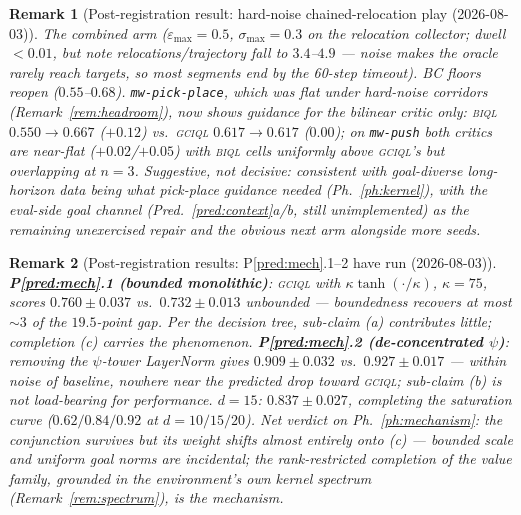 \documentclass[10pt]{article}
\newtheorem{remark}{Remark}
\begin{document}
\begin{remark}[Post-registration result: hard-noise chained-relocation play
(2026-08-03)]\label{rem:resamplehard}
The combined arm ($\varepsilon_{\max}{=}0.5$, $\sigma_{\max}{=}0.3$ on the relocation
collector; dwell $<0.01$, but note relocations/trajectory fall to $3.4$--$4.9$ ---
noise makes the oracle rarely reach targets, so most segments end by the 60-step timeout).
BC floors reopen ($0.55$--$0.68$). \texttt{mw-pick-place}, which was \emph{flat} under
hard-noise corridors (Remark~\ref{rem:headroom}), now shows guidance for the bilinear
critic only: \textsc{biql} $0.550\to0.667$ ($+0.12$) vs.\ \textsc{gciql} $0.617\to0.617$
($0.00$); on \texttt{mw-push} both critics are near-flat ($+0.02$/$+0.05$) with
\textsc{biql} cells uniformly above \textsc{gciql}'s but overlapping at $n{=}3$.
Suggestive, not decisive: consistent with goal-diverse long-horizon data being what
pick-place guidance needed (Ph.~\ref{ph:kernel}), with the eval-side goal channel
(Pred.~\ref{pred:context}a/b, still unimplemented) as the remaining unexercised repair
and the obvious next arm alongside more seeds.
\end{remark}

\begin{remark}[Post-registration results: P\ref{pred:mech}.1--2 have run (2026-08-03)]
\label{rem:mech12}
\textbf{P\ref{pred:mech}.1 (bounded monolithic)}: \textsc{gciql} with
$\kappa\tanh(\cdot/\kappa)$, $\kappa{=}75$, scores $0.760\pm0.037$ vs.\ $0.732\pm0.013$
unbounded --- boundedness recovers at most $\sim3$ of the $19.5$-point gap. Per the
decision tree, sub-claim (a) contributes little; completion (c) carries the phenomenon.
\textbf{P\ref{pred:mech}.2 (de-concentrated $\psi$)}: removing the $\psi$-tower LayerNorm
gives $0.909\pm0.032$ vs.\ $0.927\pm0.017$ --- within noise of baseline, nowhere near the
predicted drop toward \textsc{gciql}; sub-claim (b) is not load-bearing for performance.
\textbf{$d{=}15$}: $0.837\pm0.027$, completing the saturation curve
($0.62/0.84/0.92$ at $d{=}10/15/20$). Net verdict on Ph.~\ref{ph:mechanism}: the
conjunction survives but its weight shifts almost entirely onto (c) --- bounded scale and
uniform goal norms are incidental; the rank-restricted \emph{completion} of the value
family, grounded in the environment's own kernel spectrum
(Remark~\ref{rem:spectrum}), is the mechanism.
\end{remark}
\end{document}
